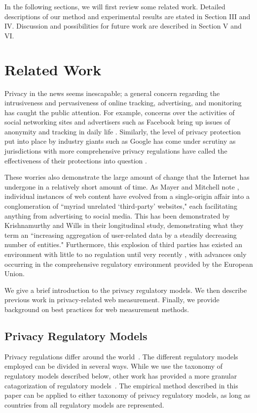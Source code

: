 \documentclass[conference]{IEEEtran}
\begin{document}
In the following sections, we will first review some related work. Detailed descriptions of our method and experimental results are stated in Section III and IV. Discussion and possibilities for future work are described in Section V and VI.


\section{Related Work}
Privacy in the news seems inescapable; a general concern regarding the intrusiveness and pervasiveness of online tracking, advertising, and monitoring has caught the public attention. For example, concerns over the activities of social networking sites and advertisers such as Facebook  bring up issues of anonymity and tracking in daily life \cite{wsj_fb}. Similarly, the level of privacy protection put into place by industry giants such as Google has come under scrutiny as jurisdictions with more comprehensive privacy regulations have called the effectiveness of their protections into question \cite{Google_EU_marketingland}.

These worries also demonstrate the large amount of change that the Internet has undergone in a relatively short amount of time. As Mayer and Mitchell note \cite{Mayer_Mitchell}, individual instances of web content have evolved from a single-origin affair into a conglomeration of  ``myriad unrelated  `third-party' websites," each facilitating anything from advertising to social media. 
This has been demonstrated by Krishnamurthy and Wills \cite{Krishnamurthy} in their longitudinal study, demonstrating what they term an ``increasing aggregation of user-related data by a steadily decreasing number of entities."
Furthermore, this explosion of third parties has existed an environment with little to no regulation until very recently \cite{Mayer_Mitchell}, with advances only occurring in the comprehensive regulatory environment provided by the European Union.  

We give a brief introduction to the privacy regulatory models.  We then describe previous work in privacy-related web measurement. Finally, we provide background on best practices for web measurement methods.

\subsection{Privacy Regulatory Models}
Privacy regulations differ around the world~\cite{flaherty1992protecting,madsen1992handbook}. The different regulatory models employed can be divided in several ways.  While we use the taxonomy of regulatory models described below, other work has provided a more granular catagorization of regulatory models~\cite{Milberg:1995:VPI:219663.219683, madsen1992handbook}.  The empirical method described in this paper can be applied to either taxonomy of privacy regulatory models, as long as countries from all regulatory models are represented.
\end{document}
